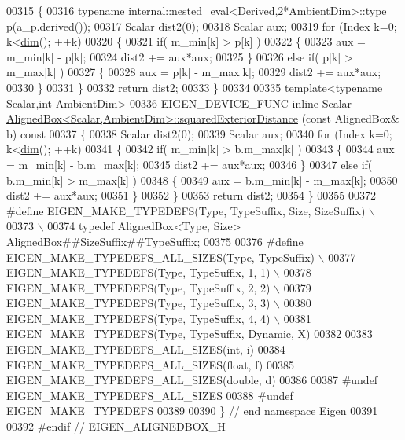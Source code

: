\begin{DoxyCode}
00315 \textcolor{keyword}{}\{
00316   \textcolor{keyword}{typename} \hyperlink{class_eigen_1_1internal_1_1_tensor_lazy_evaluator_writable}{internal::nested\_eval<Derived,2*AmbientDim>::type}
       p(a\_p.derived());
00317   Scalar dist2(0);
00318   Scalar aux;
00319   \textcolor{keywordflow}{for} (Index k=0; k<\hyperlink{group___geometry___module_ab774df3608d0be913a3aa5d67476a521}{dim}(); ++k)
00320   \{
00321     \textcolor{keywordflow}{if}( m\_min[k] > p[k] )
00322     \{
00323       aux = m\_min[k] - p[k];
00324       dist2 += aux*aux;
00325     \}
00326     \textcolor{keywordflow}{else} \textcolor{keywordflow}{if}( p[k] > m\_max[k] )
00327     \{
00328       aux = p[k] - m\_max[k];
00329       dist2 += aux*aux;
00330     \}
00331   \}
00332   \textcolor{keywordflow}{return} dist2;
00333 \}
00334 
00335 \textcolor{keyword}{template}<\textcolor{keyword}{typename} Scalar,\textcolor{keywordtype}{int} AmbientDim>
00336 EIGEN\_DEVICE\_FUNC \textcolor{keyword}{inline} Scalar 
      \hyperlink{group___geometry___module_aa6d9ffc81bd77da631fef6559f45cf13}{AlignedBox<Scalar,AmbientDim>::squaredExteriorDistance}
      (\textcolor{keyword}{const} AlignedBox& b)\textcolor{keyword}{ const}
00337 \textcolor{keyword}{}\{
00338   Scalar dist2(0);
00339   Scalar aux;
00340   \textcolor{keywordflow}{for} (Index k=0; k<\hyperlink{group___geometry___module_ab774df3608d0be913a3aa5d67476a521}{dim}(); ++k)
00341   \{
00342     \textcolor{keywordflow}{if}( m\_min[k] > b.m\_max[k] )
00343     \{
00344       aux = m\_min[k] - b.m\_max[k];
00345       dist2 += aux*aux;
00346     \}
00347     \textcolor{keywordflow}{else} \textcolor{keywordflow}{if}( b.m\_min[k] > m\_max[k] )
00348     \{
00349       aux = b.m\_min[k] - m\_max[k];
00350       dist2 += aux*aux;
00351     \}
00352   \}
00353   \textcolor{keywordflow}{return} dist2;
00354 \}
00355 
00372 \textcolor{preprocessor}{#define EIGEN\_MAKE\_TYPEDEFS(Type, TypeSuffix, Size, SizeSuffix)    \(\backslash\)}
00373 \textcolor{preprocessor}{                                 \(\backslash\)}
00374 \textcolor{preprocessor}{typedef AlignedBox<Type, Size>   AlignedBox##SizeSuffix##TypeSuffix;}
00375 
00376 \textcolor{preprocessor}{#define EIGEN\_MAKE\_TYPEDEFS\_ALL\_SIZES(Type, TypeSuffix) \(\backslash\)}
00377 \textcolor{preprocessor}{EIGEN\_MAKE\_TYPEDEFS(Type, TypeSuffix, 1, 1) \(\backslash\)}
00378 \textcolor{preprocessor}{EIGEN\_MAKE\_TYPEDEFS(Type, TypeSuffix, 2, 2) \(\backslash\)}
00379 \textcolor{preprocessor}{EIGEN\_MAKE\_TYPEDEFS(Type, TypeSuffix, 3, 3) \(\backslash\)}
00380 \textcolor{preprocessor}{EIGEN\_MAKE\_TYPEDEFS(Type, TypeSuffix, 4, 4) \(\backslash\)}
00381 \textcolor{preprocessor}{EIGEN\_MAKE\_TYPEDEFS(Type, TypeSuffix, Dynamic, X)}
00382 
00383 EIGEN\_MAKE\_TYPEDEFS\_ALL\_SIZES(\textcolor{keywordtype}{int},                  i)
00384 EIGEN\_MAKE\_TYPEDEFS\_ALL\_SIZES(\textcolor{keywordtype}{float},                f)
00385 EIGEN\_MAKE\_TYPEDEFS\_ALL\_SIZES(\textcolor{keywordtype}{double},               d)
00386 
00387 \textcolor{preprocessor}{#undef EIGEN\_MAKE\_TYPEDEFS\_ALL\_SIZES}
00388 \textcolor{preprocessor}{#undef EIGEN\_MAKE\_TYPEDEFS}
00389 
00390 \} \textcolor{comment}{// end namespace Eigen}
00391 
00392 \textcolor{preprocessor}{#endif // EIGEN\_ALIGNEDBOX\_H}
\end{DoxyCode}
